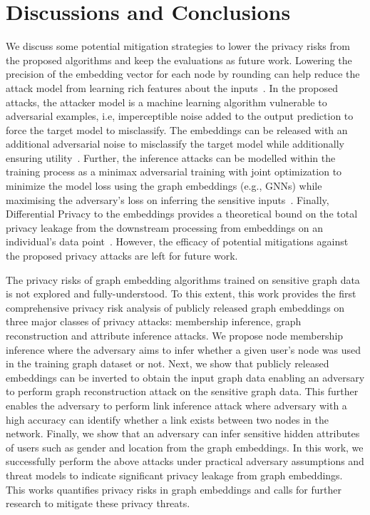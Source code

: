 \vspace{-2mm}
\section{Discussions and Conclusions}
\label{conclusions}

We discuss some potential mitigation strategies to lower the privacy risks from the proposed algorithms and keep the evaluations as future work.
Lowering the precision of the embedding vector for each node by rounding can help reduce the attack model from learning rich features about the inputs~\cite{membershipinf,nlp}.
In the proposed attacks, the attacker model is a machine learning algorithm vulnerable to adversarial examples, i.e, imperceptible noise added to the output prediction to force the target model to misclassify.
The embeddings can be released with an additional adversarial noise to misclassify the target model while additionally ensuring utility~\cite{attriguard,memguard}.
Further, the inference attacks can be modelled within the training process as a minimax adversarial training with joint optimization to minimize the model loss using the graph embeddings (e.g., GNNs) while maximising the adversary's loss on inferring the sensitive inputs~\cite{advreg,textembleak}.
Finally, Differential Privacy to the embeddings provides a theoretical bound on the total privacy leakage from the downstream processing from embeddings on an individual's data point~\cite{dptext,dpne}.
However, the efficacy of potential mitigations against the proposed privacy attacks are left for future work.



The privacy risks of graph embedding algorithms trained on sensitive graph data is not explored and fully-understood.
To this extent, this work provides the first comprehensive privacy risk analysis of publicly released graph embeddings on three major classes of privacy attacks: membership inference, graph reconstruction and attribute inference attacks.
We propose node membership inference where the adversary aims to infer whether a given user's node was used in the training graph dataset or not.
Next, we show that publicly released embeddings can be inverted to obtain the input graph data enabling an adversary to perform graph reconstruction attack on the sensitive graph data.
This further enables the adversary to perform link inference attack where adversary with a high accuracy can identify whether a link exists between two nodes in the network.
Finally, we show that an adversary can infer sensitive hidden attributes of users such as gender and location from the graph embeddings.
In this work, we successfully perform the above attacks under practical adversary assumptions and threat models to indicate significant privacy leakage from graph embeddings.
This works quantifies privacy risks in graph embeddings and calls for further research to mitigate these privacy threats.
